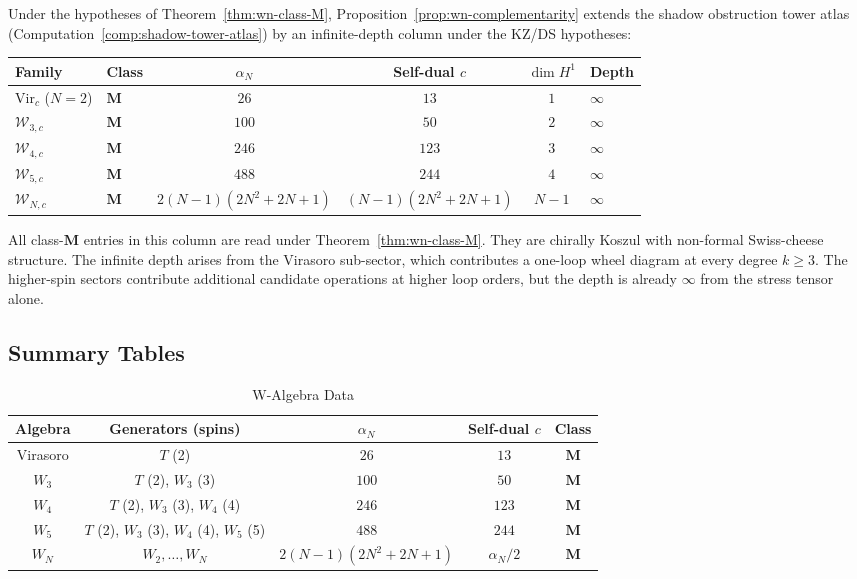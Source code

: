 \begin{remark}
\label{rem:wn-shadow-atlas}
%
Under the hypotheses of Theorem~\ref{thm:wn-class-M},
Proposition~\ref{prop:wn-complementarity}
extends the shadow obstruction tower atlas
(Computation~\ref{comp:shadow-tower-atlas}) by
an infinite-depth column under the KZ/DS hypotheses:

\begin{center}
\small
\renewcommand{\arraystretch}{1.3}
\begin{tabular}{llcccl}
\toprule
\textbf{Family} & \textbf{Class}
 & $\alpha_N$ & Self-dual $c$ & $\dim H^1$ & \textbf{Depth} \\
\midrule
$\mathrm{Vir}_c$ ($N=2$) & $\mathbf{M}$
 & $26$ & $13$ & $1$ & $\infty$ \\
$\mathcal{W}_{3,c}$ & $\mathbf{M}$
 & $100$ & $50$ & $2$ & $\infty$ \\
$\mathcal{W}_{4,c}$ & $\mathbf{M}$
 & $246$ & $123$ & $3$ & $\infty$ \\
$\mathcal{W}_{5,c}$ & $\mathbf{M}$
 & $488$ & $244$ & $4$ & $\infty$ \\
$\mathcal{W}_{N,c}$ & $\mathbf{M}$
 & $2(N\!-\!1)(2N^2\!+\!2N\!+\!1)$
 & $(N\!-\!1)(2N^2\!+\!2N\!+\!1)$
 & $N\!-\!1$ & $\infty$ \\
\bottomrule
\end{tabular}
\end{center}

\noindent
All class-$\mathbf M$ entries in this column are read under
Theorem~\ref{thm:wn-class-M}. They are chirally Koszul with
non-formal Swiss-cheese structure. The infinite depth arises from the
Virasoro sub-sector, which contributes a one-loop wheel diagram
at every degree $k \ge 3$. The higher-spin sectors contribute
additional candidate operations at higher loop orders,
but the depth is already $\infty$ from the stress tensor alone.
\end{remark}

\subsection{Summary Tables}

\begin{table}[h]
\centering
\caption{W-Algebra Data}
\begin{tabular}{|c|c|c|c|c|}
\hline
Algebra & Generators (spins) & $\alpha_N$ & Self-dual $c$ & Class \\
\hline
Virasoro & $T$ (2) & $26$ & $13$ & $\mathbf{M}$ \\
$W_3$ & $T$ (2), $W_3$ (3) & $100$ & $50$ & $\mathbf{M}$ \\
$W_4$ & $T$ (2), $W_3$ (3), $W_4$ (4) & $246$ & $123$ & $\mathbf{M}$ \\
$W_5$ & $T$ (2), $W_3$ (3), $W_4$ (4), $W_5$ (5) & $488$ & $244$ & $\mathbf{M}$ \\
$W_N$ & $W_2, \ldots, W_N$ & $2(N\!-\!1)(2N^2\!+\!2N\!+\!1)$ & $\alpha_N/2$ & $\mathbf{M}$ \\
\hline
\end{tabular}
\end{table}

